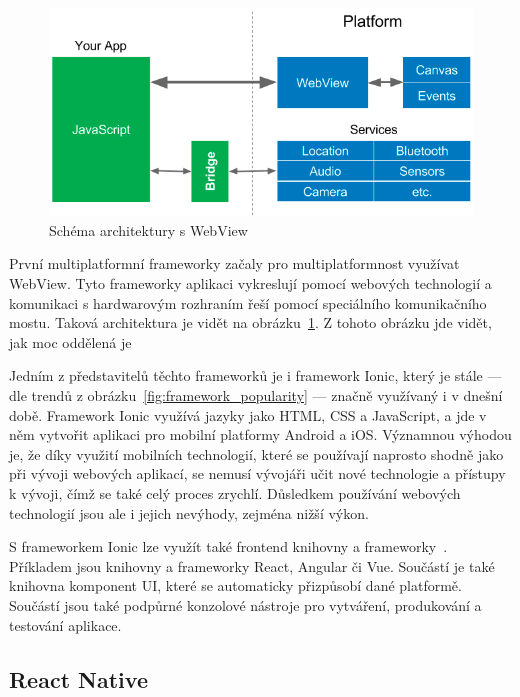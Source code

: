 \begin{figure}[ht!]
    \centering
    \includegraphics[width=\linewidth]{assets/technology-research/framework/webview.png}
    \caption{Schéma architektury s WebView
    ~\cite{hackernoon_flutter}}
    \label{fig:framework_webview}
\end{figure}

První multiplatformní frameworky začaly pro multiplatformnost využívat WebView.
\cite{hackernoon_flutter}
Tyto frameworky aplikaci vykreslují pomocí webových technologií
a komunikaci s hardwarovým rozhraním řeší pomocí speciálního komunikačního
mostu.
Taková architektura je vidět na obrázku~\ref{fig:framework_webview}.
Z tohoto obrázku jde vidět,
jak moc oddělená je 

Jedním z představitelů těchto frameworků je i framework Ionic,
který je stále
--- dle trendů z obrázku~\ref{fig:framework_popularity} ---
značně využívaný i v dnešní době.
Framework Ionic využívá jazyky jako HTML, CSS a JavaScript,
a jde v něm vytvořit aplikaci pro mobilní platformy Android a iOS.
Významnou výhodou je,
že díky využití mobilních technologií,
které se používají naprosto shodně jako při vývoji webových aplikací,
se nemusí vývojáři učit nové technologie a přístupy k vývoji,
čímž se také celý proces zrychlí.
Důsledkem používání webových technologií jsou ale i jejich nevýhody,
zejména nižší výkon.~\cite{dashmagazine_mobile_frameworks}

S frameworkem Ionic lze využít také frontend knihovny a frameworky~\cite{ionic}.
Příkladem jsou knihovny a frameworky React, Angular či Vue.
Součástí je také knihovna komponent UI,
které se automaticky přizpůsobí dané platformě.
Součástí jsou také podpůrné konzolové nástroje pro vytváření, produkování a
testování aplikace.

\subsection{React Native}

